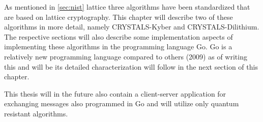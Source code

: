 As mentioned in \ref{sec:nist} lattice three algorithms have been standardized that are based on lattice cryptography. This chapter will describe two of these algorithms in more detail, namely CRYSTALS-Kyber and CRYSTALS-Dilithium. The respective sections will also describe some implementation aspects of implementing these algorithms in the programming language Go. Go is a relatively new programming language compared to others (2009) as of writing this \cite{Donovan2016} and will be its detailed characterization will follow in the next section of this chapter.

This thesis will in the future also contain a client-server application for exchanging messages also programmed in Go and will utilize only quantum resistant algorithms.